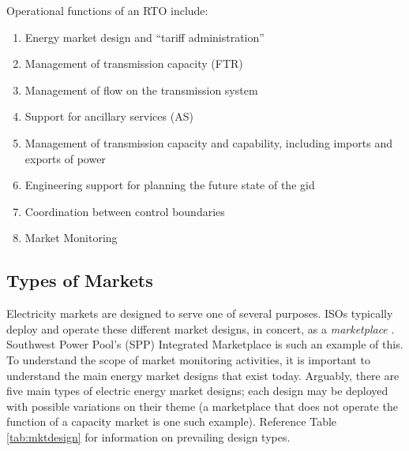 \noindent Operational functions of an RTO include:
\begin{enumerate}
\item{Energy market design and “tariff administration”}
\item{Management of transmission capacity (FTR)}
\item{Management of flow on the transmission system}
\item{Support for ancillary services (AS)}
\item{Management of transmission capacity and capability, including imports and exports of power}
\item{Engineering support for planning the future state of the gid}
\item{Coordination between control boundaries}
\item{Market Monitoring}

\end{enumerate}

\subsection{Types of Markets}

Electricity markets are designed to serve one of several purposes. ISOs typically deploy and operate these different market designs, in concert, as a \textit{marketplace} \cite{ferc2}. Southwest Power Pool's (SPP) Integrated Marketplace is such an example of this. To understand the scope of market monitoring activities, it is important to understand the main energy market designs that exist today. Arguably, there are five main types of electric energy market designs; each design may be deployed with possible variations on their theme (a marketplace that does not operate the function of a capacity market is one such example). Reference Table \ref{tab:mktdesign} for information on prevailing design types.

